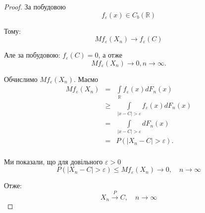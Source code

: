 \begin{proof}
    За побудовою
    $$f_{\varepsilon}(x) \in C_b(\mathbb{R})$$
    
    Тому:
    $$Mf_{\varepsilon}(X_n) \rightarrow f_{\varepsilon}(C)$$
    
    Але за побудовою: $f_{\varepsilon}(C) = 0$, а отже
    $$Mf_{\varepsilon}(X_n) \rightarrow 0, n \rightarrow \infty.$$
    
    Обчислимо $Mf_{\varepsilon}(X_n)$.
    Маємо
    $$\begin{array}{rcl}
        Mf_{\varepsilon}(X_n) & = & \int\limits_{\mathbb{R}} f_{\varepsilon}(x) dF_n(x) \\
        & \geqslant & \int\limits_{|x - C| > \varepsilon} f_{\varepsilon}(x) dF_n(x) \\
        & = & \int\limits_{|x - C| > \varepsilon} dF_n(x) \\
        & = & P(|X_n - C| > \varepsilon). \\
    \end{array}$$

    Ми показали, що для довільного $\varepsilon > 0$
    $$P(|X_n-C| > \varepsilon) \leqslant Mf_{\varepsilon}(X_n) \rightarrow 0, \quad n \rightarrow \infty$$
    
    Отже:
    $$X_n \xrightarrow{P} C, \quad n \rightarrow \infty$$
\end{proof}

